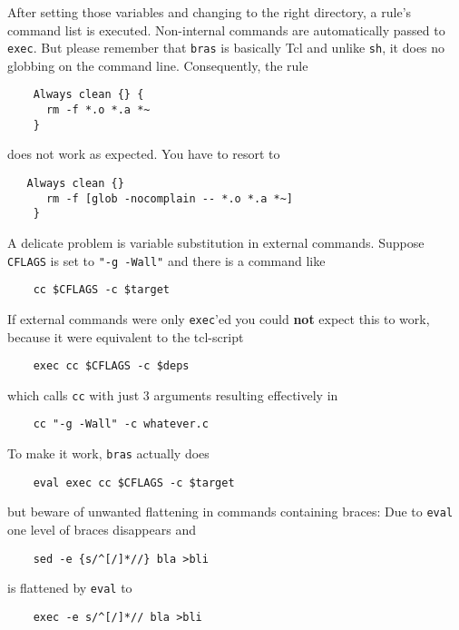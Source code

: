 \documentclass[12pt]{article}
\newcommand{\bras}{\texttt{bras}}
\begin{document}
After setting those variables and changing to the right directory, a
rule's command list is executed. Non-internal commands are
automatically passed to \texttt{exec}. But please remember that
\bras{} is basically Tcl and unlike \texttt{sh}, it does no globbing
on the command line. Consequently, the rule
\begin{verbatim}
    Always clean {} {
      rm -f *.o *.a *~
    }
\end{verbatim}
does not work as expected. You have to resort to
\begin{verbatim}
   Always clean {}
      rm -f [glob -nocomplain -- *.o *.a *~]
    }
\end{verbatim}
    
A delicate problem is variable substitution in
external commands. Suppose \texttt{CFLAGS} is set to 
\texttt{"-g -Wall"} and there is a command like 

\begin{verbatim}
    cc $CFLAGS -c $target
\end{verbatim}

If external commands were only \texttt{exec}'ed you could \textbf{not}
expect this to work, because it were equivalent to the tcl-script

\begin{verbatim}
    exec cc $CFLAGS -c $deps
\end{verbatim}

which calls \texttt{cc} with just 3 arguments resulting effectively in

\begin{verbatim}
    cc "-g -Wall" -c whatever.c
\end{verbatim}

To make it work, \bras{} actually does

\begin{verbatim}
    eval exec cc $CFLAGS -c $target
\end{verbatim}

but beware of unwanted flattening in commands containing braces: Due
to \texttt{eval} one level of braces
disappears and

\begin{verbatim}
    sed -e {s/^[/]*//} bla >bli
\end{verbatim}

is flattened by \texttt{eval} to

\begin{verbatim}
    exec -e s/^[/]*// bla >bli
\end{verbatim}
\end{document}
